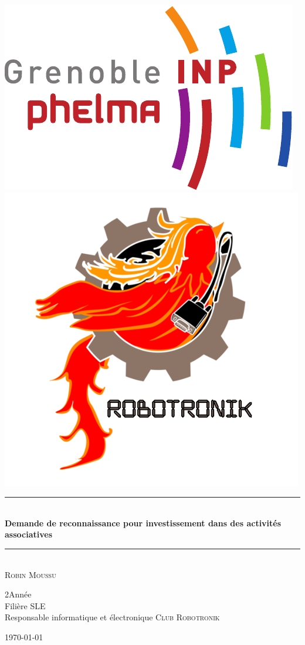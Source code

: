 \documentclass[a4paper,11pt]{article} \usepackage[T1]{fontenc} \usepackage[utf8]{inputenc} \usepackage[francais]{babel}
\begin{document}
\begin{titlepage}
\includegraphics[scale=0.45]{Public/logo_phelma.pdf}\hfill\includegraphics[scale=0.55]{Public/logo_robotronik.png}
\begin{center}
    \vspace*{2cm}
    \rule{\linewidth}{0.5mm}\\[0.4cm]
    {\huge\bfseries Demande de reconnaissance pour investissement dans des activités associatives\\
    [0.4cm]}\rule{\linewidth}{0.5mm}\\[1.0cm]
    \large{\textsc{Robin Moussu}}
    \begin{flushright} \large
        2\ieme Année \\
        Filière \textsc{SLE} \\
        Responsable informatique et électronique \textsc{Club Robotronik}\\
    \end{flushright}
    \vfill

    \large{\today}
\end{center}
\end{titlepage}
    \tableofcontents        %
\newpage
{}  %
\end{document}
